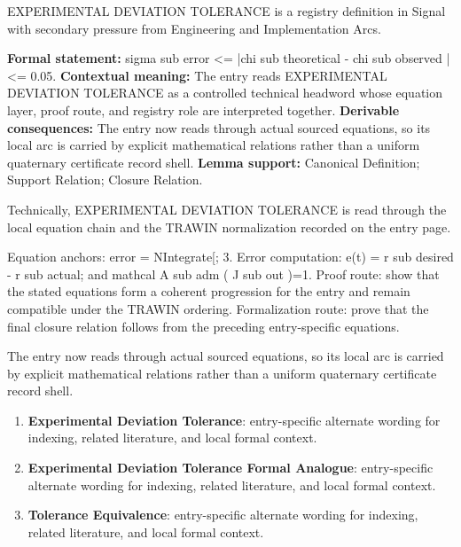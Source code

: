 
\begingroup\small
{}
EXPERIMENTAL DEVIATION TOLERANCE is a registry definition in Signal with secondary pressure from Engineering and Implementation Arcs.

\begingroup\footnotesize\setlength{\emergencystretch}{3em}\sloppy
\textbf{Formal statement:} sigma sub error <= |chi sub theoretical - chi sub observed | <= 0.05. \textbf{Contextual meaning:} The entry reads EXPERIMENTAL DEVIATION TOLERANCE as a controlled technical headword whose equation layer, proof route, and registry role are interpreted together. \textbf{Derivable consequences:} The entry now reads through actual sourced equations, so its local arc is carried by explicit mathematical relations rather than a uniform quaternary certificate record shell. \textbf{Lemma support:} Canonical Definition; Support Relation; Closure Relation.\par
\endgroup

Technically, EXPERIMENTAL DEVIATION TOLERANCE is read through the local equation chain and the TRAWIN normalization recorded on the entry page.

Equation anchors: error = NIntegrate[; 3. Error computation: e(t) = r sub desired - r sub actual; and mathcal A sub adm ( J sub out )=1. Proof route: show that the stated equations form a coherent progression for the entry and remain compatible under the TRAWIN ordering. Formalization route: prove that the final closure relation follows from the preceding entry-specific equations.

The entry now reads through actual sourced equations, so its local arc is carried by explicit mathematical relations rather than a uniform quaternary certificate record shell.
\endgroup

\begin{enumerate}[leftmargin=1.6em,itemsep=6pt,topsep=4pt]
\item \textbf{Experimental Deviation Tolerance}: entry-specific alternate wording for indexing, related literature, and local formal context.
\item \textbf{Experimental Deviation Tolerance Formal Analogue}: entry-specific alternate wording for indexing, related literature, and local formal context.
\item \textbf{Tolerance Equivalence}: entry-specific alternate wording for indexing, related literature, and local formal context.
\end{enumerate}

